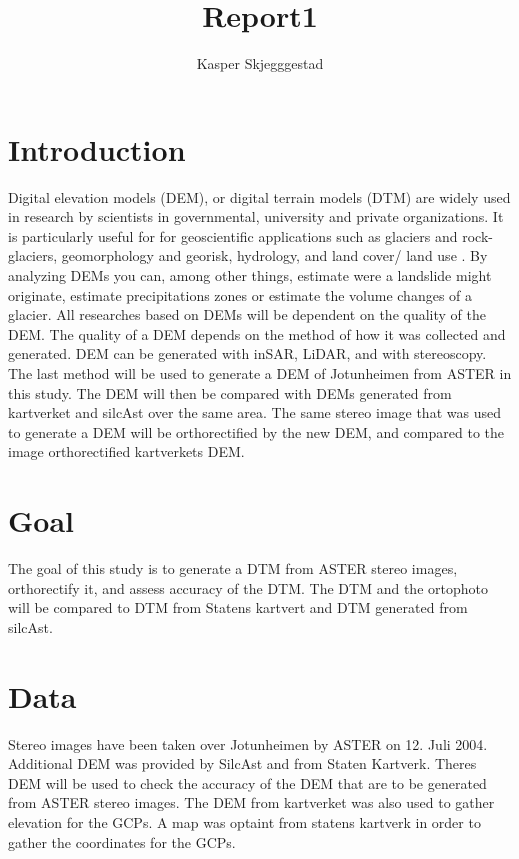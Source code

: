 \documentclass[a4paper,UKenglish]{article}
\title{Report1}
\author{Kasper Skjegggestad}
\begin{document}
\maketitle
\tableofcontents

\section{Introduction}

Digital elevation models (DEM), or digital terrain models (DTM) are widely used in research by scientists in governmental, university and private organizations. It is particularly useful for for geoscientific applications such as glaciers and rock-glaciers, geomorphology and georisk, hydrology, and land cover/ land use \citep{toutin08}. By analyzing DEMs you can, among other things, estimate were a landslide might originate, estimate precipitations zones or estimate the volume changes of a glacier. All researches based on DEMs will be dependent on the quality of the DEM. The quality of a DEM depends on the method of how it was collected and generated. DEM can be generated with inSAR, LiDAR, and with stereoscopy. The last method will be used to generate a DEM of Jotunheimen from ASTER in this study. The DEM will then be compared with DEMs generated from kartverket and silcAst over the same area. The same stereo image that was used to generate a DEM will be orthorectified by the new DEM, and compared to the image orthorectified kartverkets DEM.

\section{Goal}

The goal of this study is to generate a DTM from ASTER stereo images, orthorectify it, and assess accuracy of the DTM. The DTM and the ortophoto will be compared to DTM from Statens kartvert and DTM generated from silcAst. 

\section{Data}

Stereo images have been taken over Jotunheimen by ASTER on 12. Juli 2004. Additional DEM was provided by SilcAst and from Staten Kartverk. Theres DEM will be used to check the accuracy of the DEM that are to be generated from ASTER stereo images. The DEM from kartverket was also used to gather elevation for the GCPs. A map was optaint from statens kartverk in order to gather the coordinates for the GCPs.
\end{document}
